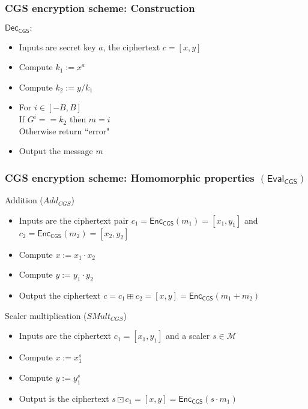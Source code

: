 \documentclass{beamer}
\begin{document}
\begin{frame}[t]
\frametitle{CGS encryption scheme: Construction}



\begin{block}{$\mathsf{Dec_{CGS}:}$}
\begin{itemize}
\item Inputs are secret key $a$, the ciphertext $c=[x,y]$
\item Compute  $k_1 := x^a$
\item Compute $k_2 := y/{k_1}$              
\item For $i \in [-B,B]$\\
 If {$G^i==k_2$} then $m=i$\\
 Otherwise return ``error"
\item Output the message $m$
\end{itemize} 
\end{block}
\end{frame}

\begin{frame}
\frametitle{CGS encryption scheme: Homomorphic properties $(\mathsf{Eval_{CGS}})$}

\begin{block}{Addition ($Add_{CGS}$)}
\begin{itemize}
\item Inputs are the ciphertext pair $c_1=\mathsf{Enc_{CGS}}(m_1)=[x_1,y_1]$ and $c_2=\mathsf{Enc_{CGS}}(m_2)=[x_2,y_2]$
\item Compute  $x := x_1 \cdot x_2$
\item Compute  $y := y_1 \cdot y_2$ 
\item Output the ciphertext $c=c_1 \boxplus c_2=[x,y]=\mathsf{Enc_{CGS}}(m_1+m_2)$
\end{itemize} 
\end{block}

\begin{block}{Scaler multiplication ($SMult_{CGS}$)}
\begin{itemize}
\item Inputs are the ciphertext $c_1=[x_1,y_1]$ and a scaler $s \in \mathcal{M}$
\item Compute $x := x_1^s$
\item Compute $y := y_1^s$
\item Output is the ciphertext $s \boxdot c_1=[x,y]=\mathsf{Enc_{CGS}}(s\cdot m_1)$
\end{itemize} 
\end{block}
\end{frame}
\end{document}
